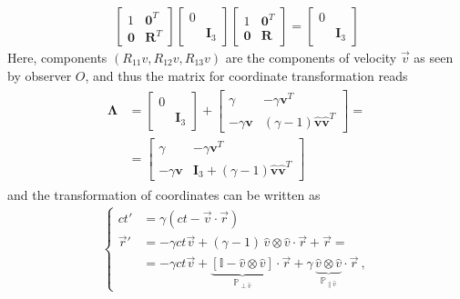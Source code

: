 \documentclass[letterpaper,10pt,english]{jupyterBook}
\begin{document}
\begin{equation*}
\begin{split}\begin{bmatrix} 1 & \mathbf{0}^T \\ \mathbf{0} & \mathbf{R}^T \end{bmatrix}  \begin{bmatrix} 0 & \\ & \mathbf{I}_3  \end{bmatrix} \begin{bmatrix} 1 & \mathbf{0}^T \\ \mathbf{0} & \mathbf{R} \end{bmatrix} = \begin{bmatrix} 0 & \\ & \mathbf{I}_3 \end{bmatrix}\end{split}
\end{equation*}
\sphinxAtStartPar
Here, components \((R_{11} v, R_{12} v, R_{13} v)\) are the components of velocity \(\vec{v}\) as seen by observer \(O\), and thus the matrix for coordinate transformation reads
\begin{equation}\label{equation:ch/relativity-special/lorentz:lorentz:transformations:general:matrix}
\begin{split}\begin{aligned}
  \symbf{\Lambda}
  & = \begin{bmatrix} 0 & \\ & \mathbf{I}_3 \end{bmatrix} + \begin{bmatrix} \gamma & - \gamma \mathbf{v}^T \\ -\gamma \mathbf{v} & (\gamma-1) \mathbf{\hat{v}}\mathbf{\hat{v}}^T \end{bmatrix} = \\
  & = \begin{bmatrix} \gamma & - \gamma \mathbf{v}^T \\ -\gamma \mathbf{v} & \mathbf{I}_3 + (\gamma-1) \mathbf{\hat{v}}\mathbf{\hat{v}}^T  \end{bmatrix}
\end{aligned}\end{split}
\end{equation}
\sphinxAtStartPar
and the transformation of coordinates can be written as
\begin{equation}\label{equation:ch/relativity-special/lorentz:lorentz:transformations:general:time-space}
\begin{split}\begin{cases} 
  c t'     & = \gamma ( ct - \vec{v} \cdot \vec{r} )  \\
  \vec{r}' & = - \gamma c t \vec{v} + (\gamma-1) \, \hat{v} \otimes \hat{v} \cdot \vec{r} + \vec{r} = \\
           & = - \gamma c t \vec{v} + \underbrace{\left[ \mathbb{I} - \hat{v} \otimes \hat{v} \right]}_{\mathbb{P}_{\perp\hat{v}}} \cdot \vec{r} + \gamma \, \underbrace{\hat{v} \otimes \hat{v}}_{\mathbb{P}_{\parallel\hat{v}}}  \cdot \vec{r} \ ,
\end{cases}\end{split}
\end{equation}
\end{document}
